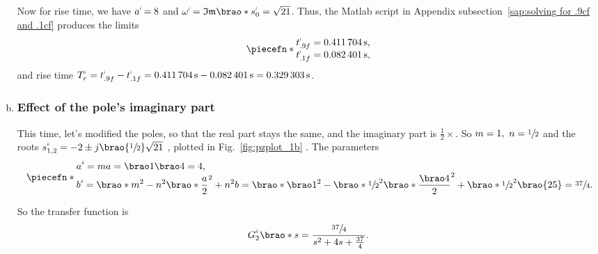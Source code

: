 \documentclass[12pt]{article}
\DeclarePairedDelimiter\brao()%
\DeclarePairedDelimiter\piecefn\{.
\newcommand{\setprime}[2][1]{%
    {#2}^{%
        \raisebox{1pt}{%
            \scalebox{0.5}{%
                \itshape\sffamily\uppercase%
                \expandafter{%
                    \romannumeral#1%
                }%
            }%
        }
    }%
}%
\begin{document}
\begin{enumerate}[(a)]
        Now for rise time, we have $\setprime{a} = 8$ and $\setprime\omega = \mathfrak{Im}\brao*{\setprime{s}_0} = \sqrt{21}$.
        Thus, the Matlab script in Appendix subsection~\ref{sap:solving for .9cf and .1cf} produces the limits
        \begin{equation}
            \piecefn*{
                \begin{array}{@{}l@{}}
                    \setprime{t}_{.9f} = \SI{0.411704}\second,
                \\*
                    \setprime{t}_{.1f} = \SI{0.082401}\second,
                \\*
                \end{array}
            }
        \end{equation}
        and rise time $\setprime{T}_r = \setprime{t}_{.9f} - \setprime{t}_{.1f} = \SI{0.411704}\second - \SI{0.082401}\second = \SI{0.329303}\second$.

    \item
        \subsubsection{Effect of the pole's imaginary part}
        This time, let's modified the poles, so that the real part stays the same, and the imaginary part is $\frac12\times$.
        So $m = 1,\ n = \sfrac12$
        and the roots $\setprime[2]s_{1,2} = -2 \pm j\brao{\sfrac12}\sqrt{21}$
        , plotted in Fig.~\ref{fig:pzplot_1b}%
        . The parameters
        \begin{equation}
            \piecefn*{
                \begin{array}{@{}l@{}}\displaystyle
                    \setprime[2]a = ma = \brao1\brao4 = 4,
                \\*\displaystyle
                      \setprime[2]b
                    = \brao*{m^2 - n^2}\brao*{\frac{a}2}^2 + n^2b
                    = \brao*{\brao1^2 - \brao*{\sfrac12}^2}\brao*{\frac{\brao4}2}^2 + \brao*{\sfrac12}^2\brao{25}
                    = \sfrac{37}4\rlap.
                \end{array}
            }
        \end{equation}

        So the transfer function is
        \begin{equation}
            \setprime[2]{G}_2\brao*s = \frac{\sfrac{37}4}{s^2 + 4s + \tfrac{37}4}.
        \end{equation}


\end{enumerate}
\end{document}
